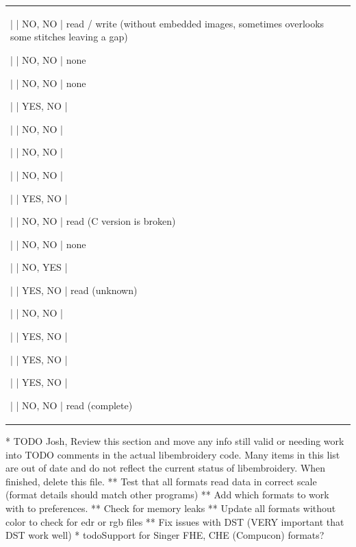 \begin{tabular}{l l l}
| \index{\texttt{pec}}
| NO, NO
| read / write (without embedded images, sometimes overlooks some stitches leaving a gap)

| \index{\texttt{pel}}
| NO, NO
| none

| \index{\texttt{pem}}
| NO, NO
| none

| \index{\texttt{pes}}
| YES, NO
|

| \index{\texttt{phb}}
| NO, NO
|

| \index{\texttt{phc}}
| NO, NO
|

| \index{\texttt{rgb}}
| NO, NO
|

| \index{\texttt{sew}}
| YES, NO
|

| \index{\texttt{shv}}
| NO, NO
| read (C version is broken)

| \index{\texttt{sst}}
| NO, NO
| none

| \index{\texttt{svg}}
| NO, YES
|

| \index{\texttt{tap}}
| YES, NO
| read (unknown)

| \index{\texttt{u01}}
| NO, NO
|

| \index{\texttt{vip}}
| YES, NO
|

| \index{\texttt{vp3}}
| YES, NO
|

| \index{\texttt{xxx}}
| YES, NO
|

| \index{\texttt{zsk}}
| NO, NO
| read (complete)
\end{tabular}* TODO Josh, Review this section and move any info still valid or
needing work into TODO comments in the actual
libembroidery code. Many items in this list are out of date and do not reflect the current status of
libembroidery. When finished, delete this file.
** Test that all formats read data in correct scale (format details should match other programs)
** Add which formats to work with to preferences.
** Check for memory leaks
** Update all formats without color to check for edr or rgb files
** Fix issues with DST (VERY important that DST work well)
* todoSupport for Singer FHE, CHE (Compucon) formats?

